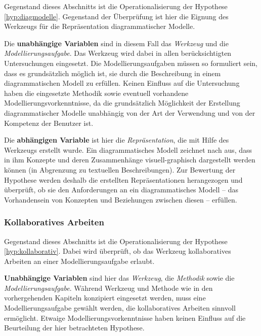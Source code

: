 Gegenstand dieses Abschnitts ist die Operationalisierung der Hypothese \ref{hyp:diagmodelle}. Gegenstand der Überprüfung ist hier die Eignung des Werkzeugs für die Repräsentation diagrammatischer Modelle.

Die \textbf{unabhängige Variablen} sind in diesem Fall das \emph{Werkzeug} und die \emph{Modellierungsaufgabe}. Das Werkzeug wird dabei in allen berücksichtigten Untersuchungen eingesetzt. Die Modellierungsaufgaben müssen so formuliert sein, dass es grundsätzlich möglich ist, sie durch die Beschreibung in einem diagrammatischen Modell zu erfüllen. Keinen Einfluss auf die Untersuchung haben die eingesetzte Methodik sowie eventuell vorhandene Modellierungsvorkenntnisse, da die grundsätzlich Möglichkeit der Erstellung diagrammatischer Modelle unabhängig von der Art der Verwendung und von der Kompetenz der Benutzer ist. 

Die \textbf{abhängigen Variable} ist hier die \emph{Repräsentation}, die mit Hilfe des Werkzeugs erstellt wurde. Ein diagrammatisches Modell zeichnet nach \citep{Larkin87} aus, dass in ihm Konzepte und deren Zusammenhänge visuell-graphisch dargestellt werden können (in Abgrenzung zu textuellen Beschreibungen). Zur Bewertung der Hypothese werden deshalb die erstellten Repräsentationen herangezogen und überprüft, ob sie den Anforderungen an ein diagrammatisches Modell -- das Vorhandensein von Konzepten und Beziehungen zwischen diesen -- erfüllen.


\subsubsection{Kollaboratives Arbeiten} %
\label{ssub:kollaboratives_arbeiten}

Gegenstand dieses Abschnitts ist die Operationalisierung der Hypothese \ref{hyp:kollaborativ}. Dabei wird überprüft, ob das Werkzeug kollaboratives Arbeiten an einer Modellierungsaufgabe erlaubt.

\textbf{Unabhängige Variablen} sind hier das \emph{Werkzeug}, die \emph{Methodik} sowie die \emph{Modellierungsaufgabe}. Während Werkzeug und Methode wie in den vorhergehenden Kapiteln konzipiert eingesetzt werden, muss eine Modellierungsaufgabe gewählt werden, die kollaboratives Arbeiten sinnvoll ermöglicht. Etwaige Modellierungsvorkenntnisse haben keinen Einfluss auf die Beurteilung der hier betrachteten Hypothese.

